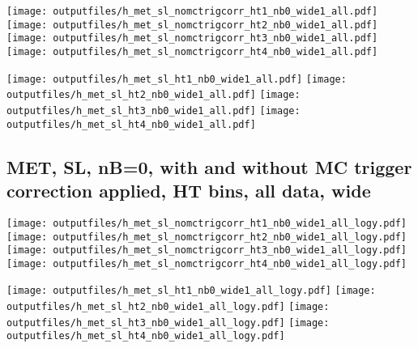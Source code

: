 \documentclass[11pt]{article}
\begin{document}
    \noindent
     \texttt{[image: outputfiles/h\_met\_sl\_nomctrigcorr\_ht1\_nb0\_wide1\_all.pdf]}
     \texttt{[image: outputfiles/h\_met\_sl\_nomctrigcorr\_ht2\_nb0\_wide1\_all.pdf]}
     \texttt{[image: outputfiles/h\_met\_sl\_nomctrigcorr\_ht3\_nb0\_wide1\_all.pdf]}
     \texttt{[image: outputfiles/h\_met\_sl\_nomctrigcorr\_ht4\_nb0\_wide1\_all.pdf]}

    \noindent
     \texttt{[image: outputfiles/h\_met\_sl\_ht1\_nb0\_wide1\_all.pdf]}
     \texttt{[image: outputfiles/h\_met\_sl\_ht2\_nb0\_wide1\_all.pdf]}
     \texttt{[image: outputfiles/h\_met\_sl\_ht3\_nb0\_wide1\_all.pdf]}
     \texttt{[image: outputfiles/h\_met\_sl\_ht4\_nb0\_wide1\_all.pdf]}

    \clearpage
     \subsection{ MET, SL, nB=0, with and without MC trigger correction applied, HT bins, all data, wide}

    \noindent
     \texttt{[image: outputfiles/h\_met\_sl\_nomctrigcorr\_ht1\_nb0\_wide1\_all\_logy.pdf]}
     \texttt{[image: outputfiles/h\_met\_sl\_nomctrigcorr\_ht2\_nb0\_wide1\_all\_logy.pdf]}
     \texttt{[image: outputfiles/h\_met\_sl\_nomctrigcorr\_ht3\_nb0\_wide1\_all\_logy.pdf]}
     \texttt{[image: outputfiles/h\_met\_sl\_nomctrigcorr\_ht4\_nb0\_wide1\_all\_logy.pdf]}


    \noindent
     \texttt{[image: outputfiles/h\_met\_sl\_ht1\_nb0\_wide1\_all\_logy.pdf]}
     \texttt{[image: outputfiles/h\_met\_sl\_ht2\_nb0\_wide1\_all\_logy.pdf]}
     \texttt{[image: outputfiles/h\_met\_sl\_ht3\_nb0\_wide1\_all\_logy.pdf]}
     \texttt{[image: outputfiles/h\_met\_sl\_ht4\_nb0\_wide1\_all\_logy.pdf]}


     \clearpage


\end{document}
